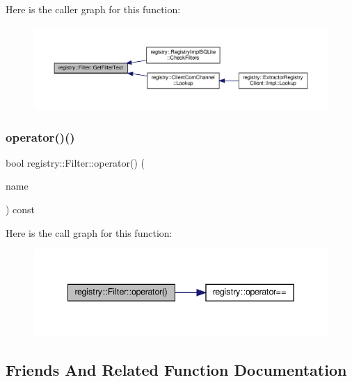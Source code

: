 Here is the caller graph for this function\+:
\nopagebreak
\begin{figure}[H]
\begin{center}
\leavevmode
\includegraphics[width=350pt]{classregistry_1_1Filter_ac0f7882d01e05fe52a3d71b548aabd50_icgraph}
\end{center}
\end{figure}
\mbox{\label{classregistry_1_1Filter_a88b3490d87c58983a16acb2c5fba077e}} 
\subsubsection{\texorpdfstring{operator()()}{operator()()}}
{\footnotesize\ttfamily bool registry\+::\+Filter\+::operator() (\begin{DoxyParamCaption}\item[{\hyperlink{classregistry_1_1Filter_adca74845d8a5adb325dea6fb17dbcb2e}{Name\+Type} const \&}]{name }\end{DoxyParamCaption}) const\hspace{0.3cm}{\ttfamily [inline]}}

Here is the call graph for this function\+:
\nopagebreak
\begin{figure}[H]
\begin{center}
\leavevmode
\includegraphics[width=342pt]{classregistry_1_1Filter_a88b3490d87c58983a16acb2c5fba077e_cgraph}
\end{center}
\end{figure}


\subsection{Friends And Related Function Documentation}
\mbox{\label{classregistry_1_1Filter_a2258c07ccd7708c4f4cad83338a14c4d}} 
